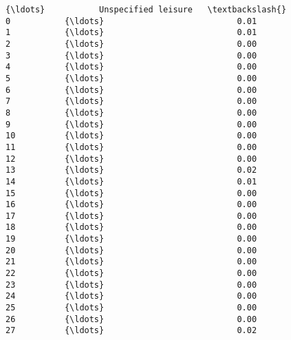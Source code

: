 \documentclass[11pt]{article}
\begin{document}
\begin{Verbatim}[commandchars=\\\{\}]
            {\ldots}           Unspecified leisure   \textbackslash{}
0           {\ldots}                           0.01   
1           {\ldots}                           0.01   
2           {\ldots}                           0.00   
3           {\ldots}                           0.00   
4           {\ldots}                           0.00   
5           {\ldots}                           0.00   
6           {\ldots}                           0.00   
7           {\ldots}                           0.00   
8           {\ldots}                           0.00   
9           {\ldots}                           0.00   
10          {\ldots}                           0.00   
11          {\ldots}                           0.00   
12          {\ldots}                           0.00   
13          {\ldots}                           0.02   
14          {\ldots}                           0.01   
15          {\ldots}                           0.00   
16          {\ldots}                           0.00   
17          {\ldots}                           0.00   
18          {\ldots}                           0.00   
19          {\ldots}                           0.00   
20          {\ldots}                           0.00   
21          {\ldots}                           0.00   
22          {\ldots}                           0.00   
23          {\ldots}                           0.00   
24          {\ldots}                           0.00   
25          {\ldots}                           0.00   
26          {\ldots}                           0.00   
27          {\ldots}                           0.02   


\end{Verbatim}
\end{document}
